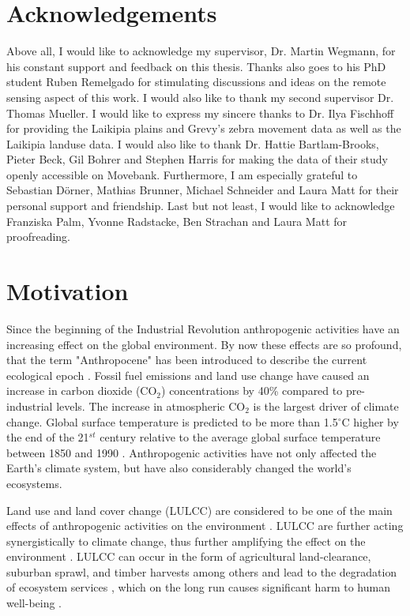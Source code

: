 \documentclass[12pt,a4paper, twoside, english]{article}
\begin{document}
\section*{Acknowledgements}
\renewcommand{\baselinestretch}{1.5}\normalsize
{}
{\small
Above all, I would like to acknowledge my supervisor, Dr. Martin Wegmann, for his constant support and feedback on this thesis. Thanks also goes to his PhD student Ruben Remelgado for stimulating discussions and ideas on the remote sensing aspect of this work. I would also like to thank my second supervisor Dr. Thomas Mueller. I would like to express my sincere thanks to Dr. Ilya Fischhoff for providing the Laikipia plains and Grevy's zebra movement data as well as the Laikipia landuse data. I would also like to thank Dr. Hattie Bartlam-Brooks, Pieter Beck, Gil Bohrer and Stephen Harris for making the data of their study openly accessible on Movebank. Furthermore, I am especially grateful to Sebastian Dörner, Mathias Brunner, Michael Schneider and Laura Matt for their personal support and friendship. Last but not least, I would like to acknowledge Franziska Palm, Yvonne Radstacke, Ben Strachan and Laura Matt for proofreading.
}

\newpage
{}
\section{Motivation}

Since the beginning of the Industrial Revolution anthropogenic activities have an increasing effect on the global environment. By now these effects are so profound, that the term "Anthropocene" has been introduced to describe the current ecological epoch \citep{Crutzen2002, Steffen2007, Lewis2015, Corlett2015}. Fossil fuel emissions and land use change have caused an increase in carbon dioxide (CO$_{2}$) concentrations by 40\% compared to pre-industrial levels. The increase in atmospheric CO$_{2}$ is the largest driver of climate change. Global surface temperature is predicted to be more than 1.5$^{\circ}$C higher by the end of the 21$^{st}$ century relative to the average global surface temperature between 1850 and 1990 \citep{IPCC2013}. Anthropogenic activities have not only affected the Earth's climate system, but have also considerably changed the world's ecosystems. 

Land use and land cover change (LULCC) are considered to be one of the main effects of anthropogenic activities on the environment \citep{Foley2005, Burkhard2012}. LULCC are further acting synergistically to climate change, thus further amplifying the effect on the environment \citep{Lambin2001, Opdam2004}. LULCC can occur in the form of agricultural land-clearance, suburban sprawl, and timber harvests among others \citep{Lambin2001} and lead to the degradation of ecosystem services \citep{Burkhard2012}, which on the long run causes significant harm to human well-being \citep{MEA2005}. 
\end{document}
